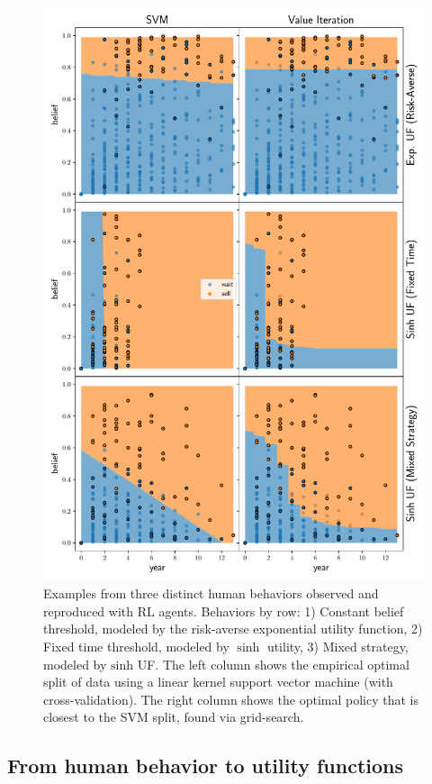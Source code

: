 \begin{figure}[h]
    \centering
    \includegraphics[width=0.99\linewidth]{img/fit}
    \caption{Examples from three distinct human behaviors observed and reproduced with RL agents. Behaviors by row: 1) Constant belief threshold, modeled by the risk-averse exponential utility function, 2) Fixed time threshold, modeled by $\sinh$ utility, 3) Mixed strategy, modeled by $\text{sinh}$ UF. The left column shows the empirical optimal split of data using a linear kernel support vector machine (with cross-validation). The right column shows the optimal policy that is closest to the SVM split, found via grid-search.}
    \label{fig:svm_vs_value}
\end{figure}

\subsection{From human behavior to utility functions}\label{ssec:human-behavior}

